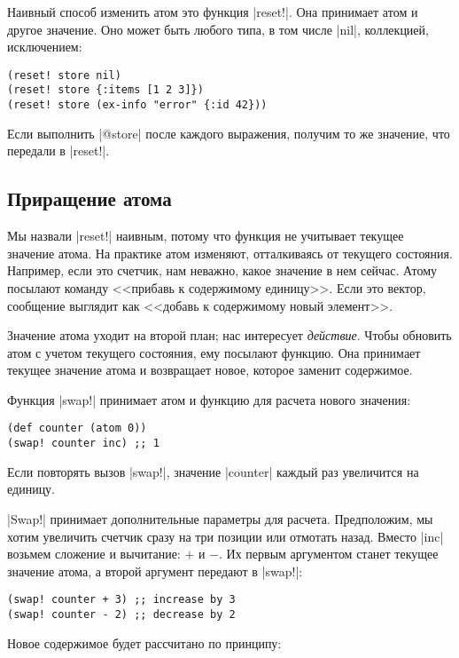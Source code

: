 Наивный способ изменить атом это функция \spverb|reset!|. Она принимает атом и
другое значение. Оно может быть любого типа, в том числе \spverb|nil|,
коллекцией, исключением:

\begin{verbatim}
(reset! store nil)
(reset! store {:items [1 2 3]})
(reset! store (ex-info "error" {:id 42}))
\end{verbatim}

Если выполнить \spverb|@store| после каждого выражения, получим то же значение,
что передали в \spverb|reset!|.

\subsection{Приращение атома}

Мы назвали \spverb|reset!| наивным, потому что функция не учитывает текущее
значение атома. На практике атом изменяют, отталкиваясь от текущего состояния.
Например, если это счетчик, нам неважно, какое значение в нем сейчас. Атому
посылают команду <<прибавь к содержимому единицу>>. Если это вектор, сообщение
выглядит как <<добавь к содержимому новый элемент>>.

Значение атома уходит на второй план; нас интересует \emph{действие}. Чтобы
обновить атом с учетом текущего состояния, ему посылают функцию. Она принимает
текущее значение атома и возвращает новое, которое заменит содержимое.

Функция \spverb|swap!| принимает атом и функцию для расчета нового значения:

\begin{verbatim}
(def counter (atom 0))
(swap! counter inc) ;; 1
\end{verbatim}

Если повторять вызов \spverb|swap!|, значение \spverb|counter| каждый раз
увеличится на единицу.

\spverb|Swap!| принимает дополнительные параметры для расчета. Предположим, мы
хотим увеличить счетчик сразу на три позиции или отмотать назад. Вместо
\spverb|inc| возьмем сложение и вычитание: $+$ и $-$. Их первым аргументом
станет текущее значение атома, а второй аргумент передают в \spverb|swap!|:

\begin{verbatim}
(swap! counter + 3) ;; increase by 3
(swap! counter - 2) ;; decrease by 2
\end{verbatim}

Новое содержимое будет рассчитано по принципу:

